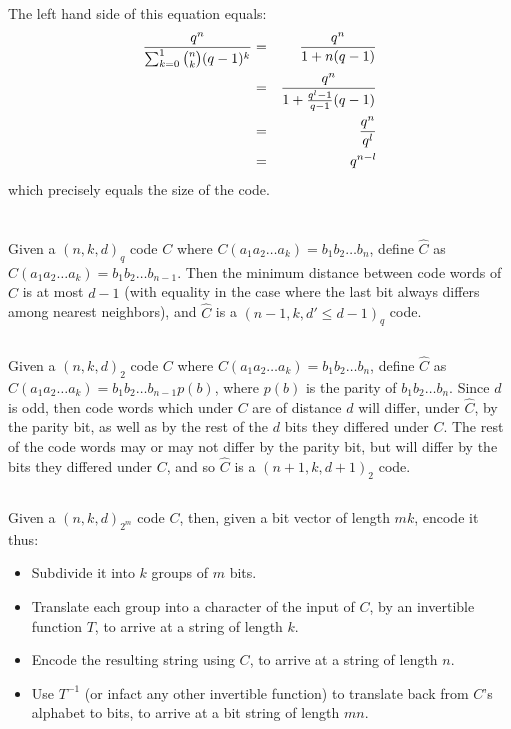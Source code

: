\documentclass[11pt]{article} \usepackage{amssymb}
\begin{document}
The left hand side of this equation equals:
\begin{eqnarray*}
  {q^n\over \sum_{k=0}^1{{n \choose k}(q-1)^k}}
&=&{q^n\over 1 + n(q-1)}\\
&=&{q^n\over 1 + {q^l-1\over q-1}(q-1)}\\
&=&{q^n\over q^l}\\
&=&q^{n-l}
\end{eqnarray*}
which precisely equals the size of the code.

\section{}
\subsection{}
Given a $(n,k,d)_q$ code $C$ where 
$C(a_1a_2\ldots a_k)=b_1b_2\ldots b_n$, define $\hat{C}$ as 
$\hat{C}(a_1a_2\ldots a_k)=b_1b_2\ldots b_{n-1}$. Then the minimum distance between code words of
$\hat{C}$ is at most $d-1$ (with equality in the case where
the last bit always differs among nearest neighbors), 
and $\hat{C}$ is a $(n-1,k,d'\leq d - 1)_q$ code.  
\subsection{}
Given a $(n,k,d)_2$ code $C$ where 
$C(a_1a_2\ldots a_k)=b_1b_2\ldots b_n$, define $\hat{C}$ as 
$\hat{C}(a_1a_2\ldots a_k)=b_1b_2\ldots b_{n-1}p(b)$, where $p(b)$ is the parity
of $b_1b_2\ldots b_n$. Since $d$ is odd, then code words which under $C$ are
of distance $d$ will differ, under $\hat{C}$, by the parity bit, as well as by the rest
of the $d$ bits they differed under $C$. 
The rest of the code words 
may or may not differ by the parity bit, but will differ by the bits they 
differed under $C$, and so $\hat{C}$ is a $(n+1,k,d +1)_2$ code.  

\subsection{}
Given a $(n,k,d)_{2^m}$ code $C$, then, given a bit vector of length $mk$,
encode it thus:
\begin{itemize}
\item Subdivide it into $k$ groups of $m$ bits.
\item Translate each group into a character of the input of $C$, by 
      an invertible function $T$, to arrive at a string of length $k$.
\item Encode the resulting string using $C$, to arrive at a string of
      length $n$.
\item Use $T^{-1}$ (or infact any other invertible function) to translate
      back from $C$'s alphabet to bits, to arrive at a bit string
      of length $mn$.
\end{itemize}
\end{document}
